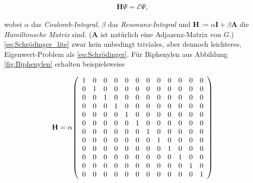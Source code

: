         \begin{align} \label{eq:Schrödinger_lite}
            \mathbf H \Psi = \mathcal E \Psi,
        \end{align}

        wobei $\alpha$ das \textit{Coulomb-Integral}, $\beta$ das \textit{Resonanz-Integral} und $\mathbf H := \alpha \mathbf I + \beta \mathbf A$ die \textit{Hamiltonsche Matrix} sind.
        ($\mathbf A$ ist natürlich eine Adjazenz-Matrix von $G$.)
        \eqref{eq:Schrödinger_lite} zwar kein unbedingt triviales, aber dennoch leichteres, Eigenwert-Problem als \eqref{eq:Schrödinger}.
        Für Biphenylen aus Abbildung \ref{fig:Biphenylen} erhalten beispielsweise

        \resizebox{\linewidth}{!}
        {
            \begin{minipage}{\linewidth}
                \begin{align*}
                    \mathbf H
                    =
                    \alpha
                    {\left ( 
                        \begin{array}{cccccccccccc}
                            1 & 0 & 0 & 0 & 0 & 0 & 0 & 0 & 0 & 0 & 0 & 0 \\
                            0 & 1 & 0 & 0 & 0 & 0 & 0 & 0 & 0 & 0 & 0 & 0 \\
                            0 & 0 & 1 & 0 & 0 & 0 & 0 & 0 & 0 & 0 & 0 & 0 \\
                            0 & 0 & 0 & 1 & 0 & 0 & 0 & 0 & 0 & 0 & 0 & 0 \\
                            0 & 0 & 0 & 0 & 1 & 0 & 0 & 0 & 0 & 0 & 0 & 0 \\
                            0 & 0 & 0 & 0 & 0 & 1 & 0 & 0 & 0 & 0 & 0 & 0 \\
                            0 & 0 & 0 & 0 & 0 & 0 & 1 & 0 & 0 & 0 & 0 & 0 \\
                            0 & 0 & 0 & 0 & 0 & 0 & 0 & 1 & 0 & 0 & 0 & 0 \\
                            0 & 0 & 0 & 0 & 0 & 0 & 0 & 0 & 1 & 0 & 0 & 0 \\
                            0 & 0 & 0 & 0 & 0 & 0 & 0 & 0 & 0 & 1 & 0 & 0 \\
                            0 & 0 & 0 & 0 & 0 & 0 & 0 & 0 & 0 & 0 & 1 & 0 \\
                            0 & 0 & 0 & 0 & 0 & 0 & 0 & 0 & 0 & 0 & 0 & 1 \\
                        \end{array}
 \right )}
\end{align*}
\end{minipage}}
